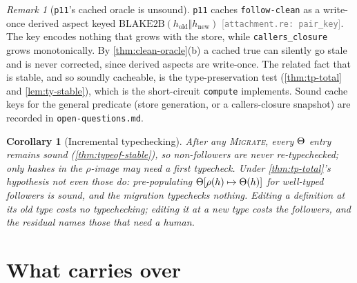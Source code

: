 \documentclass[11pt]{article}
\theoremstyle{definition}
\theoremstyle{plain}
\newtheorem{corollary}[theorem]{Corollary}
\theoremstyle{remark}
\newtheorem{remark}{Remark}[section]
\newcommand{\src}[1]{{\footnotesize\textcolor{gray}{[\texttt{#1}]}}}
\begin{document}
\begin{remark}[\texttt{p11}'s cached oracle is unsound]\label{rem:p11-cache}
\texttt{p11} caches \texttt{follow-clean} as a write-once derived aspect keyed
$\mathrm{BLAKE2B}(h_{\mathrm{old}} \Vert h_{\mathrm{new}})$ \src{attachment.re: pair\_key}.
The key encodes nothing that grows with the store, while \texttt{callers\_closure} grows
monotonically. By \cref{thm:clean-oracle}(b) a cached \textsf{true} can silently go stale and
is never corrected, since derived aspects are write-once. The related fact that is stable, and
so soundly cacheable, is the type-preservation test (\cref{thm:tp-total} and
\cref{lem:ty-stable}), which is the short-circuit \texttt{compute} implements. Sound cache keys
for the general predicate (store generation, or a callers-closure snapshot) are recorded in
\texttt{open-questions.md}.
\end{remark}

\begin{corollary}[Incremental typechecking]\label{cor:incr}
After any \textsc{Migrate}, every $\Theta$ entry remains sound (\cref{thm:typeof-stable}), so
non-followers are never re-typechecked; only hashes in the $\rho$-image may need a first
typecheck. Under \cref{thm:tp-total}'s hypothesis not even those do: pre-populating
$\Theta[\rho(h) \mapsto \Theta(h)]$ for well-typed followers is sound, and the migration
typechecks nothing. Editing a definition at its old type costs no typechecking; editing it at
a new type costs the followers, and the residual names those that need a human.
\end{corollary}

\section{What carries over}\label{sec:carryover}
\end{document}
